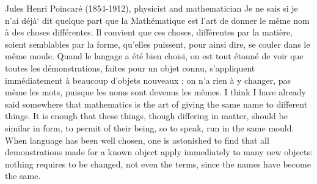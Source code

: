 \qboxnqt
  {
    Jules Henri Poincar\'e (1854-1912), physicist and mathematician
    \footnotemark
  }
  {Je ne sais si je n'ai d\'ej\`a` dit quelque part que la Math\'ematique est 
  l'art de donner le m\^eme nom \`a des choses diff\'erentes. 
  Il convient que ces choses, diff\'erentes par la mati\`ere, 
  soient semblables par la forme, qu'elles puissent, 
  pour ainsi dire, se couler dans le m\^eme moule. 
  Quand le langage a \'et\'e bien choisi, on est tout \'etonn\'e 
  de voir que toutes les d\'emonstrations, faites pour un objet connu, 
  s'appliquent imm\'ediatement \`a beaucoup d'objets nouveaux ; 
  on n'a rien \`a y changer, pas m\^eme les mots, puisque les noms sont devenus les m\^emes.}
  {I think I have already said somewhere that mathematics is the art
   of giving the same name to different things. 
   It is enough that these things, though differing in matter, 
   should be similar in form, to permit of their being, so to speak,
   run in the same mould.
   When language has been well chosen, one is astonished to find that all
   demonstrations made for a known object apply immediately to many new objects:
   nothing requires to be changed, not even the terms,
   since the names have become the same.}

